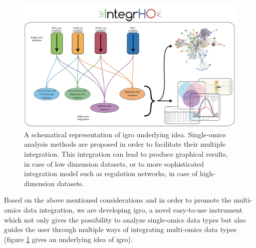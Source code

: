 
\begin{figure}[ht]
\centering
\includegraphics[width=\textwidth, keepaspectratio]{img/integrho/integrho_scheme.pdf}
\caption[IntegrHO representation]{A schematical representation of \gls{igro} underlying idea.
Single-omics analysis methods are proposed in order to facilitate their multiple integration.
This integration can lead to produce graphical results, in case of low dimension datasets, or to more sophisticated integration model such as regulation networks, in case of high-dimension datasets.}
\label{fig:integrhoidea}
\end{figure}

Based on the above mentioned considerations and in order to promote the multi-omics data integration, we are developing \gls{igro},  a novel easy-to-use instrument which not only gives the possibility to analyze single-omics data types but also guides the user through multiple ways of integrating multi-omics data types (figure \ref{fig:integrhoidea} gives an underlying idea of \gls{igro}).








